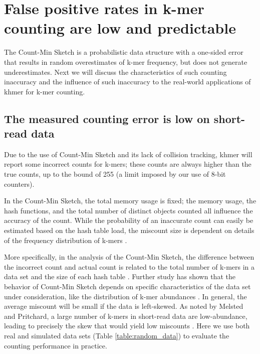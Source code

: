 \section{False positive rates in k-mer counting are low and predictable}

The Count-Min Sketch is a probabilistic data structure with a one-sided
error that results in random overestimates of k-mer frequency, but
does not generate underestimates. Next we will discuss the characteristics of 
such counting inaccuracy and the influence of such inaccuracy to the real-world 
applications of khmer for k-mer counting.

\subsection{The measured counting error is low on short-read data}


Due to the use of Count-Min Sketch and its lack of collision tracking,
khmer will report some incorrect counts for k-mers; these counts are
always higher than the true counts, up to the bound of 255 (a limit
imposed by our use of 8-bit counters).

In the Count-Min Sketch, the total memory usage is fixed; the memory
usage, the hash functions, and the total number of distinct objects
counted all influence the accuracy of the count.  While the
probability of an inaccurate count can easily be estimated based on
the hash table load, the miscount size is dependent on details of the
frequency distribution of k-mers \cite{Cormode2005}.

More specifically, in the analysis of the Count-Min Sketch, the
difference between the incorrect count and actual count is related to
the total number of k-mers in a data set and the size of each hash
table \cite{Cormode2005}. Further study has shown that the behavior of
Count-Min Sketch depends on specific characteristics of the data set
under consideration, like the distribution of k-mer abundances \cite{Rusu2008,
  CormodeM05}. In general, the average miscount will be small if the data is
left-skewed.  As noted by Melsted and Pritchard, a large number of
k-mers in short-read data are low-abundance, leading to precisely the
skew that would yield low miscounts \cite{Melsted2011}.  Here we use
both real and simulated data sets (Table \ref{table:random_data}) to evaluate the counting performance
in practice.

